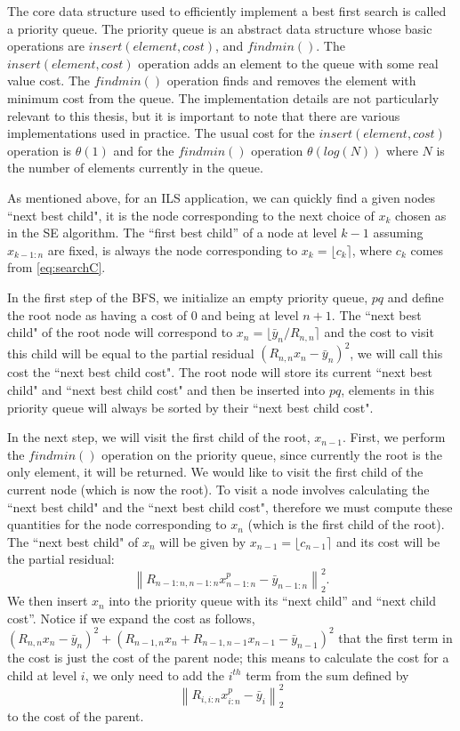 \documentclass[12pt,Bold,letterpaper]{mcgilletdclass}
\begin{document}
The core data structure used to efficiently implement a best first search is called a priority queue. The priority queue is an abstract data structure whose basic operations are $insert(element,cost)$, and $findmin()$. The $insert(element,cost)$ operation adds an element to the queue with some real value cost. The $findmin()$ operation finds and removes the element with minimum cost from the queue. The implementation details are not particularly relevant to this thesis, but it is important to note that there are various implementations used in practice. The usual cost for the $insert(element,cost)$ operation is $\theta(1)$ and for the $findmin()$ operation $\theta(log(N))$ where $N$ is the number of elements currently in the queue.

As mentioned above, for an ILS application, we can quickly find a given nodes ``next best child", it is the node corresponding to the next choice of $x_k$ chosen as in the SE algorithm. The ``first best child'' of a node at level $k-1$ assuming $x_{k-1:n}$ are fixed, is always the node corresponding to $x_k = \lfloor c_k \rceil$, where $c_k$ comes from \eqref{eq:searchC}.

In the first step of the BFS, we initialize an empty priority queue, $pq$ and define the root node as having a cost of $0$ and being at level $n+1$. The ``next best child" of the root node will correspond to $x_n = \lfloor \bar{y}_n/R_{n,n} \rceil$ and the cost to visit this child will be equal to the partial residual $(R_{n,n}x_n - \bar{y}_n)^2$, we will call this cost the ``next best child cost". The root node will store its current ``next best child" and ``next best child cost" and then be inserted into $pq$, elements in this priority queue will always be sorted by their ``next best child cost".

In the next step, we will visit the first child of the root, $x_{n-1}$. First, we perform the $findmin()$ operation on the priority queue, since currently the root is the only element, it will be returned. We would like to visit the first child of the current node (which is now the root). To visit a node involves calculating the ``next best child" and the ``next best child cost", therefore we must compute these quantities for the node corresponding to $x_{n}$ (which is the first child of the root). The ``next best child" of $x_n$ will be given by $x_{n-1} = \lfloor c_{n-1} \rceil$ and its cost  will be the partial residual: $$\left \| R_{n-1:n,n-1:n}x_{n-1:n}^p - \bar{y}_{n-1:n}\right \|_2^2.$$ We then insert $x_n$ into the priority queue with its ``next child'' and ``next child cost''. Notice if we expand the cost as follows, $(R_{n,n}x_n - \bar{y}_n)^2 + (R_{n-1,n}x_n + R_{n-1,n-1}x_{n-1} - \bar{y}_{n-1})^2$ that the first term in the cost is just the cost of the parent node; this means to calculate the cost for a child at level $i$, we only need to add the $i^{th}$ term from the sum defined by $$\left \| R_{i,i:n}x_{i:n}^p - \bar{y}_{i}\right \|_2^2$$ to the cost of the parent.
\end{document}
